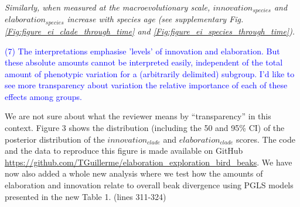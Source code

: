 \documentclass[12pt,letterpaper]{article}
\begin{document}
{\noindent\textit{Similarly, when measured at the macroevolutionary scale, $innovation_{species}$ and $elaboration_{species}$ increase with species age (see supplementary Fig. \ref{Fig:figure_ei_clade_through_time} and \ref{Fig:figure_ei_species_through_time}). }%


\textcolor{blue}{(7) The interpretations emphasise 'levels' of innovation and elaboration. But these absolute amounts cannot be interpreted easily, independent of the total amount of phenotypic variation for a (arbitrarily delimited) subgroup. I'd like to see more transparency about variation the relative importance of each of these effects among groups.}

We are not sure about what the reviewer means by “transparency” in this context. Figure 3 shows the distribution (including the 50 and 95\% CI) of the posterior distribution of the $innovation_{clade}$ and $elaboration_{clade}$ scores. The code and the data to reproduce this figure is made available on GitHub \url{https://github.com/TGuillerme/elaboration_exploration_bird_beaks}. We have now also added a whole new analysis where we test how the amounts of elaboration and innovation relate to overall beak divergence using PGLS models presented in the new Table 1. (lines 311-324)

}
\end{document}
